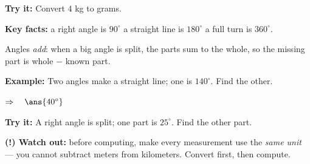 \documentclass[12pt]{article}
\begin{document}
\begin{tryitbox}
\textbf{Try it:} \quad Convert $4$ kg to grams.\\[2pt]
\end{tryitbox}


\begin{formulabox}
\textbf{Key facts:} \quad a right angle is $90^\circ$ \quad\textbullet\quad
a straight line is $180^\circ$ \quad\textbullet\quad a full turn is
$360^\circ$.\par
Angles \emph{add}: when a big angle is split, the parts sum to the whole,
so the missing part is whole $-$ known part.
\end{formulabox}

\begin{examplebox}
\textbf{Example:} \quad Two angles make a straight line; one is $140^\circ$.
Find the other.

$\Rightarrow\quad \ans{40^\circ}$
\end{examplebox}

\begin{tryitbox}
\textbf{Try it:} \quad A right angle is split; one part is $25^\circ$. Find
the other part.\\[2pt]
\end{tryitbox}

\begin{watchoutbox}
\textbf{(!) Watch out:} before computing, make every measurement use the
\emph{same unit} --- you cannot subtract meters from kilometers. Convert
first, then compute.
\end{watchoutbox}
\end{document}
